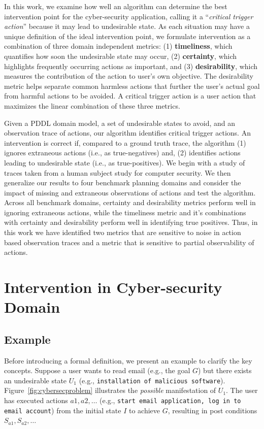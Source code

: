 In this work, we examine how well an algorithm can determine the best intervention point for the cyber-security application, calling it a ``\textit{critical trigger action}'' because it may lead to undesirable state. As each situation may have a unique definition of the ideal intervention point, we formulate intervention as a combination of three domain independent metrics: (1) \textbf{timeliness}, which quantifies how soon the undesirable state may occur, (2) \textbf{certainty}, which highlights frequently occurring actions as important, and (3) \textbf{desirability}, which measures the contribution of the action to user's own objective. The desirability metric helps separate common harmless actions that further the user's actual goal from harmful actions to be avoided. A critical trigger action is a user action that maximizes the linear combination of these three metrics.

Given a PDDL domain model, a set of undesirable states to avoid, and an observation trace of actions, our algorithm identifies critical trigger actions. An intervention is correct if, compared to a ground truth trace, the algorithm (1) ignores extraneous actions (i.e., as true-negatives) and, (2)
identifies actions leading to undesirable state (i.e., as true-positives). We begin with a study of traces taken from a human subject study for computer security. We then generalize our results to four benchmark planning domains and
consider the impact of missing and extraneous observations of actions and test the algorithm. Across all benchmark domains, certainty and desirability metrics perform well in ignoring extraneous actions, while the timeliness metric and
it's combinations with certainty and desirability perform well in identifying true positives. Thus, in this work we have identified two metrics that are sensitive to noise in action based observation traces and a metric that is sensitive to partial observability of actions.



\section{Intervention in Cyber-security Domain}
\subsection{Example}
Before introducing a formal definition, we present an example to clarify the key concepts. Suppose a user wants to read email (e.g., the goal $G$) but there exists an undesirable state $U_1$ (e.g., \texttt{installation of malicious software}). Figure~\ref{fig:cybersecproblem} illustrates the \emph{possible} manifestation of $U_1$. The user has executed actions $a1, a2, \ldots$ (e.g., \texttt{start email application, log in to email account}) from the initial state $I$ to achieve  $G$, resulting in post conditions $S_{a1}, S_{a2}, \ldots$ 

